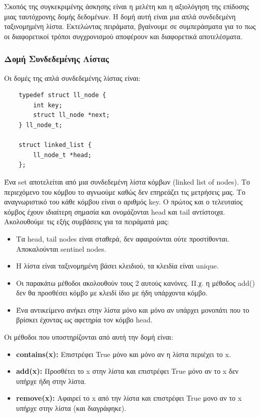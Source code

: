 \documentclass[../final_report.tex]{subfiles}
\begin{document}
Σκοπός της συγκεκριμένης άσκησης είναι η μελέτη και η αξιολόγηση της επίδοσης μιας ταυτόχρονης
δομής δεδομένων. Η δομή αυτή είναι μια απλά συνδεδεμένη ταξινομημένη λίστα. Εκτελώντας πειράματα,
βγαίνουμε σε συμπεράσματα για το πως οι διαφορετικοί τρόποι συγχρονισμού αποφέρουν και διαφορετικά
αποτελέσματα. 

\subsubsection*{Δομή Συνδεδεμένης Λίστας}
Οι δομές της απλά συνδεδεμένης λίστας είναι:

\begin{lstlisting}
    typedef struct ll_node {
        int key;
        struct ll_node *next;
    } ll_node_t;
    
    struct linked_list {
        ll_node_t *head;
    };    
\end{lstlisting}

Ένα set αποτελείται από μια συνδεδεμένη λίστα κόμβων (linked list of nodes). Το περιεχόμενο του κόμβου το αγνωούμε καθώς
δεν επηρεάζει τις μετρήσεις μας. Το αναγνωριστικό του κάθε κόμβου είναι ο αριθμός key. Ο πρώτος και ο τελευταίος κόμβος έχουν
ιδιαίτερη σημασία και ονομάζονται head και tail αντίστοιχα. Ακολουθούμε τις εξής συμβάσεις για τα πειράματά μας:

\begin{itemize}
    \item Τα head, tail nodes είναι σταθερά, δεν αφαιρούνται ούτε προστίθονται. Αποκαλούνται sentinel nodes.
    \item Η λίστα είναι ταξινομημένη βάσει κλειδιού, τα κλειδία είναι unique.
    \item Οι παρακάτω μέθοδοι ακολουθούν τους 2 αυτούς κανόνες. Π.χ. η μέθοδος add() δεν θα προσθέσει κόμβο με κλειδί ίδιο με ήδη υπάρχοντα κόμβο.
    \item Ένα αντικείμενο ανήκει στην λίστα μόνο και μόνο αν υπάρχει μονοπάτι που το βρίσκει έχοντας ως αφετηρία τον κόμβο head.
\end{itemize}

Οι μέθοδοι που υποστηρίζονται από αυτή την δομή είναι: 

\begin{itemize}
    \item \textbf{contains(x):} Επιστρέφει True μόνο και μόνο αν η λίστα περιέχει το x.
    \item \textbf{add(x):} Προσθέτει το x στην λίστα και επιστρέφει True μόνο αν το x δεν υπήρχε ήδη στην λίστα.
    \item \textbf{remove(x):} Αφαιρεί το x από την λίστα και επιστρέφει True μονο αν το x υπήρχε στην λίστα (και διαγράφηκε).
\end{itemize}
\end{document}
